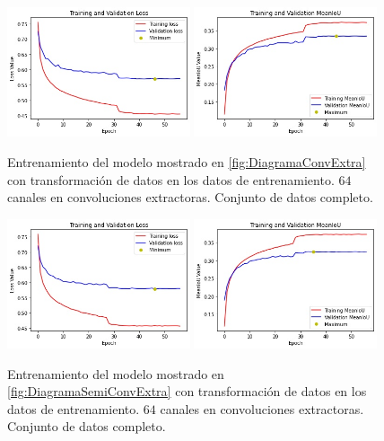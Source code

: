 \begin{figure}[h!]
  \centering
  \includegraphics[width=0.48\textwidth]{../../modelos-entrenados/unet-conv-conv/ejecucion14/loss}
  \includegraphics[width=0.48\textwidth]{../../modelos-entrenados/unet-conv-conv/ejecucion14/iou}
  \caption{Entrenamiento del modelo mostrado en \autoref{fig:DiagramaConvExtra} con transformación de datos en los datos de entrenamiento. $64$ canales en convoluciones extractoras. Conjunto de datos completo.}
  \label{fig:ejec14}
\end{figure}

\begin{figure}[h!]
  \centering
  \includegraphics[width=0.48\textwidth]{../../modelos-entrenados/unet-semconv-conv/ejecucion13/loss}
  \includegraphics[width=0.48\textwidth]{../../modelos-entrenados/unet-semconv-conv/ejecucion13/iou}
  \caption{Entrenamiento del modelo mostrado en \autoref{fig:DiagramaSemiConvExtra} con transformación de datos en los datos de entrenamiento. $64$ canales en convoluciones extractoras. Conjunto de datos completo.}
  \label{fig:ejec13}
\end{figure}

